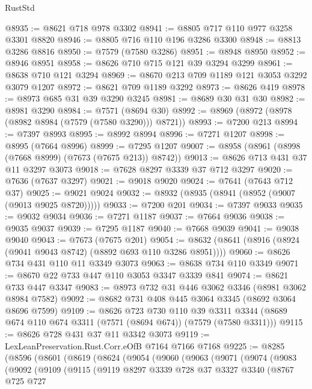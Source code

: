 \begin{lexlean}{RustStd}
\begin{coremodule}
{\begin{coremodule}
{{{{{{{{{{{{{{{{{{{{{{{{{{{{{{{{@8935 := @8621 @718 @978 @3302
@8941 := @8805 @717 @110 @977 @3258 @3301 @8820
@8946 := @8805 @716 @110 @196 @3286 @3300
@8948 := @8813 @3286 @8816
@8950 := @7579 (@7580 @3286)
@8951 := @8948 @8950
@8952 := @8946 @8951
@8958 := @8626 @710 @715 @121 @39 @3294 @3299
@8961 := @8638 @710 @121 @3294
@8969 := @8670 @213 @709 @1189 @121 @3053 @3292 @3079 @1207
@8972 := @8621 @709 @1189 @3292
@8973 := @8626 @419
@8978 := @8973 @685 @31 @39 @3290 @3245
@8981 := @8689 @30 @31 @30
@8982 := @8981 @3290
@8984 := @7571 (@8694 @30)
@8992 := @8969 (@8972 (@8978 (@8982 @8984 (@7579 (@7580 @3290))) @8721))
@8993 := @7200 @213
@8994 := @7397 @8993
@8995 := @8992 @8994
@8996 := @7271 @1207
@8998 := @8995 (@7664 @8996)
@8999 := @7295 @1207
@9007 := @8958 (@8961 (@8998 (@7668 @8999) (@7673 (@7675 @213)) @8742))
@9013 := @8626 @713 @431 @37 @11 @3297 @3073
@9018 := @7628 @8297 @3339 @37 @712 @3297
@9020 := @7636 (@7637 @3297)
@9021 := @9018 @9020
@9024 := @7641 (@7643 @712 @37)
@9025 := @9021 @9024
@9032 := @8932 (@8935 (@8941 (@8952 (@9007 (@9013 @9025 @8720)))))
@9033 := @7200 @201
@9034 := @7397 @9033
@9035 := @9032 @9034
@9036 := @7271 @1187
@9037 := @7664 @9036
@9038 := @9035 @9037
@9039 := @7295 @1187
@9040 := @7668 @9039
@9041 := @9038 @9040
@9043 := @7673 (@7675 @201)
@9054 := @8632 (@8641 (@8916 (@8924 (@9041 @9043 @8742) (@8892 @693 @110 @3286 @8951))))
@9060 := @8626 @734 @431 @110 @11 @3349 @3073
@9063 := @8638 @734 @110 @3349
@9071 := @8670 @22 @733 @447 @110 @3053 @3347 @3339 @841
@9074 := @8621 @733 @447 @3347
@9083 := @8973 @732 @31 @446 @3062 @3346 (@8981 @3062 @8984 @7582)
@9092 := @8682 @731 @408 @445 @3064 @3345 (@8692 @3064 @8696 @7599)
@9109 := @8626
    @723
    @730
    @110
    @39
    @3311
    @3344
    (@8689 @674 @110 @674 @3311 (@7571 (@8694 @674)) (@7579 (@7580 @3311)))
@9115 := @8626 @728 @431 @37 @11 @3342 @3073
@9119 := LexLeanPreservation.Rust.Corr.eOfB @7164 @7166 @7168
@9225 := @8285
    (@8596
      (@8601
        (@8619
          (@8624
            (@9054
              (@9060
                (@9063
                  (@9071
                    (@9074
                      (@9083
                        (@9092
                          (@9109
                            (@9115
                              (@9119
                                @8297
                                @3339
                                @728
                                @37
                                @3327
                                @3340
                                (@8767
                                  @725
                                  @727
}}}}}}}}}}}}}}}}}}}}}}}}}}}}}}}}
\end{coremodule}}
\end{coremodule}
\end{lexlean}
